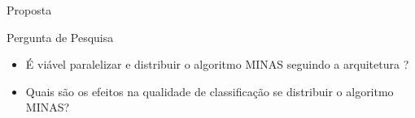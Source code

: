 \documentclass[aspectratio=1610,10pt]{beamer}
\newcommand{\minas}{MINAS\xspace}
\begin{document}

\begin{frame}[fragile]{Proposta}
  \begin{block}{Pergunta de Pesquisa}
    \begin{itemize}
      \item É viável paralelizar e distribuir o algoritmo \minas seguindo a arquitetura \arch?
      \item Quais são os efeitos na qualidade de classificação se distribuir o algoritmo \minas?
      


    \end{itemize}
  \end{block}
\end{frame}
\end{document}
